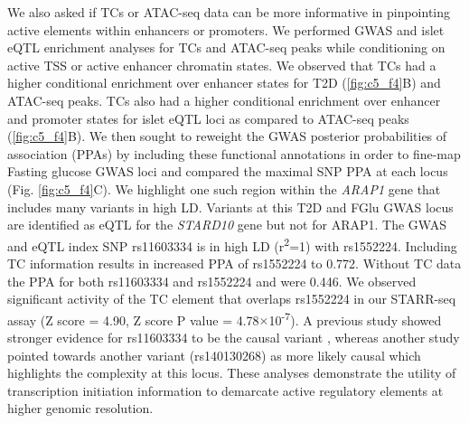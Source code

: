 We also asked if TCs or ATAC-seq data can be more informative in pinpointing active elements within enhancers or promoters. We performed GWAS and islet eQTL enrichment analyses for TCs and ATAC-seq peaks while conditioning on active TSS or active enhancer chromatin states. We observed that TCs had a higher conditional enrichment over enhancer states for T2D (\ref{fig:c5_f4}B) and ATAC-seq peaks. TCs also had a higher conditional enrichment over enhancer and promoter states for islet eQTL loci as compared to ATAC-seq peaks  (\ref{fig:c5_f4}B). We then sought to reweight the GWAS posterior probabilities of association (PPAs) by including these functional annotations in order to fine-map Fasting glucose GWAS loci and compared the maximal SNP PPA at each locus (Fig. \ref{fig:c5_f4}C). We highlight one such region within the \textit{ARAP1} gene that includes many variants in high LD. Variants at this T2D and FGlu GWAS locus are identified as eQTL for the \textit{STARD10} gene \cite{voightTwelveTypeDiabetes2010} but not for ARAP1. The GWAS and eQTL index SNP rs11603334 is in high LD (r\textsuperscript{2}=1) with rs1552224. Including TC information results in increased PPA of rs1552224 to 0.772. Without TC data the PPA for both rs11603334 and rs1552224 and were 0.446. We observed significant activity of the TC element that overlaps rs1552224 in our STARR-seq assay (Z score = 4.90, Z score P value = 4.78$\times$10\textsuperscript{-7}). A previous study showed stronger evidence for rs11603334 to be the causal variant \cite{kulzerCommonFunctionalRegulatory2014}, whereas another study pointed towards another variant (rs140130268) as more likely causal \cite{carratDecreasedSTARD10Expression2017} which highlights the complexity at this locus. These analyses demonstrate the utility of transcription initiation information to demarcate active regulatory elements at higher genomic resolution.  


